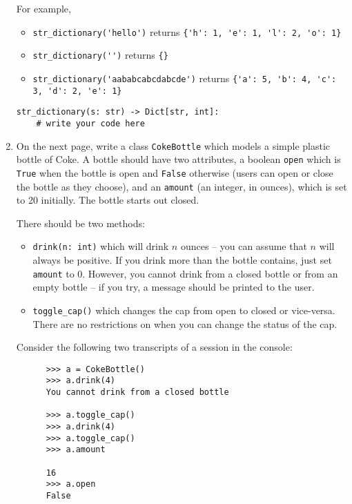 \documentclass{article}
\begin{document}
\begin{enumerate}
    For example,
    \begin{itemize}
      \item \verb|str_dictionary('hello')| returns \verb|{'h': 1, 'e': 1, 'l': 2, 'o': 1}|
      \item \verb|str_dictionary('')| returns \verb|{}|
      \item \verb|str_dictionary('aababcabcdabcde')| returns \verb|{'a': 5, 'b': 4, 'c': 3, 'd': 2, 'e': 1}|

    \end{itemize}

\begin{verbatim}
str_dictionary(s: str) -> Dict[str, int]:
    # write your code here
\end{verbatim}
\newpage

\item On the next page, write a class \verb|CokeBottle| which models a
  simple plastic bottle of Coke. A bottle should have two attributes,
  a boolean \verb|open| which is \verb|True| when the bottle is open
  and \verb|False| otherwise (users can open or close the bottle as
  they choose), and an \verb|amount| (an integer, in ounces), which is
  set to 20 initially. The bottle starts out closed.

    There should be two methods:
    \begin{itemize}
      \item \verb|drink(n: int)| which will drink $n$ ounces -- you can assume that $n$ will always be positive. If you drink more than the bottle contains, just set \verb|amount| to 0. However, you cannot drink from a closed bottle or from an empty bottle -- if you try, a message should be printed to the user.
      \item \verb|toggle_cap()| which changes the cap from open to closed or vice-versa. There are no restrictions on when you can change the status of the cap.
    \end{itemize}

    Consider the following two transcripts of a session in the console:

    \begin{verbatim}
      >>> a = CokeBottle()
      >>> a.drink(4)
      You cannot drink from a closed bottle

      >>> a.toggle_cap()
      >>> a.drink(4)
      >>> a.toggle_cap()
      >>> a.amount

      16
      >>> a.open
      False

    \end{verbatim}


\end{enumerate}
\end{document}
